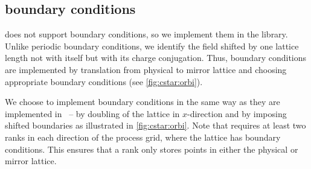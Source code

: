 \subsection{\CstarHeading boundary conditions}
\label{sec:interface:cstar}

\Quda does not support \Cstar boundary conditions, so we implement them in the \quda library.
Unlike periodic boundary conditions, we identify the field shifted by one lattice length not with itself but with its charge conjugation.
Thus, \Cstar boundary conditions are implemented by translation from physical to mirror lattice and choosing appropriate boundary conditions (see \cref{fig:cstar:orbi}).

%   

We choose to implement \Cstar boundary conditions in the same way as they are implemented in \openqxd\ -- by doubling of the lattice in $x$-direction and by imposing shifted boundaries as illustrated in \cref{fig:cstar:orbi}. Note that \openqxd requires at least two ranks in each direction of the process grid, where the lattice has \Cstar boundary conditions. This ensures that a rank only stores points in either the physical or mirror lattice.

